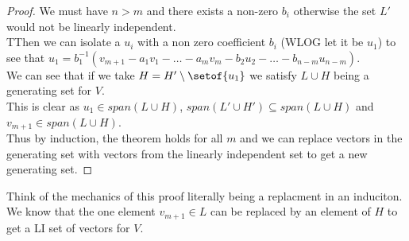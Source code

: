 \documentclass[answers,12pt,addpoints]{exam}
\begin{document}
\begin{questions}
\begin{solution}
\begin{proof}
            We must have $n > m$ and there exists a non-zero $b_i$ otherwise the set $L'$ would not be linearly independent.\\
            TThen we can isolate a $u_i$ with a non zero coefficient $b_i$ (WLOG let it be $u_1$) to see that 
            $u_1 = b_1^{-1}(v_{m+1} - a_1v_1 - \dots - a_mv_m - b_2u_2 - \dots - b_{n-m}u_{n-m})$.\\
            We can see that if we take $H = H' \setminus \setof{u_1} $ we satisfy $L \cup H$ being a generating set for $V$.\\
            This is clear as $u_1 \in span(L \cup H)$, $span(L' \cup H') \subseteq span(L \cup H)$ and $v_{m+1} \in span(L \cup H)$.\\
            Thus by induction, the theorem holds for all $m$ and we can replace vectors in the generating set with vectors from the linearly independent set to get a new generating set.
        \end{proof}
        Think of the mechanics of this proof literally being a replacment in an induciton. \\
        We know that the one element $v_{m+1} \in L$ can be replaced by an element of $H$ to get a LI set of vectors for $V$. 
    \end{solution}


\end{questions}
\end{document}
